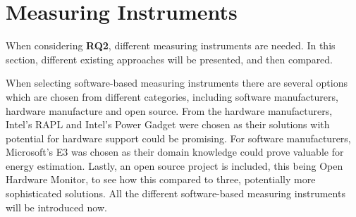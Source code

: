 \section{Measuring Instruments}\label{sec:measuring_instruments}

When considering \textbf{RQ2}, different measuring instruments are needed. In this section, different existing approaches will be presented, and then compared.

When selecting software-based measuring instruments there are several options which are chosen from different categories, including software manufacturers, hardware manufacture and open source. From the hardware manufacturers, Intel's RAPL and Intel's Power Gadget were chosen as their solutions with potential for hardware support could be promising. For software manufacturers, Microsoft's E3 was chosen as their domain knowledge could prove valuable for energy estimation. Lastly, an open source project is included, this being Open Hardware Monitor, to see how this compared to three, potentially more sophisticated solutions. All the different software-based measuring instruments will be introduced now.





